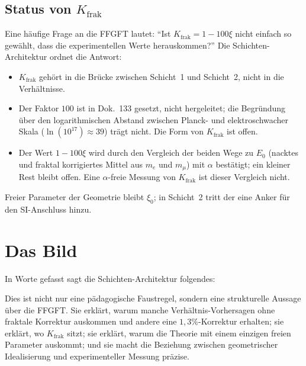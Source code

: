 \subsection{Status von $K_{\mathrm{frak}}$}

Eine häufige Frage an die FFGFT lautet: ``Ist $K_{\mathrm{frak}} = 1 -
100\xi$ nicht einfach so gewählt, dass die experimentellen Werte
herauskommen?'' Die Schichten-Architektur ordnet die Antwort:

\begin{itemize}\setlength\itemsep{0pt}
  \item $K_{\mathrm{frak}}$ gehört in die Brücke zwischen Schicht~1
        und Schicht~2, nicht in die Verhältnisse.
  \item Der Faktor $100$ ist in Dok.~133 gesetzt, nicht hergeleitet;
        die Begründung über den logarithmischen Abstand zwischen Planck-
        und elektroschwacher Skala ($\ln(10^{17}) \approx 39$) trägt
        nicht. Die Form von $K_{\mathrm{frak}}$ ist offen.
  \item Der Wert $1 - 100\xi$ wird durch den Vergleich der beiden Wege
        zu $E_0$ (nacktes und fraktal korrigiertes Mittel aus $m_e$ und
        $m_\mu$) mit $\alpha$ bestätigt; ein kleiner Rest bleibt offen.
        Eine $\alpha$-freie Messung von $K_{\mathrm{frak}}$ ist dieser
        Vergleich nicht.
\end{itemize}

Freier Parameter der Geometrie bleibt $\xi_{0}$; in Schicht~2 tritt der
eine Anker für den SI-Anschluss hinzu.

\section{Das Bild}

In Worte gefasst sagt die Schichten-Architektur folgendes:

\begin{center}
\end{center}

Dies ist nicht nur eine pädagogische Faustregel, sondern eine
strukturelle Aussage über die FFGFT. Sie erklärt, warum manche
Verhältnis-Vorhersagen ohne fraktale Korrektur auskommen und andere eine
$1{,}3\%$-Korrektur erhalten; sie erklärt, wo $K_{\mathrm{frak}}$ sitzt; sie
erklärt, warum die Theorie mit einem einzigen freien Parameter
auskommt; und sie macht die Beziehung zwischen geometrischer
Idealisierung und experimenteller Messung präzise.

